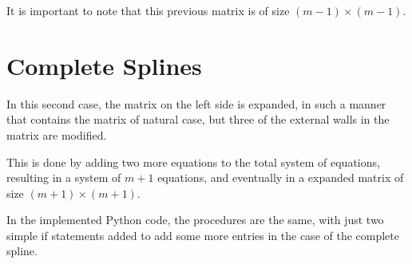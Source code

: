 \documentclass[paper=a4, fontsize=11pt]{scrartcl} %
\numberwithin{equation}{section} %
\numberwithin{figure}{section} %
\numberwithin{table}{section} %
\begin{document}
It is important to note that this previous matrix is of size $(m-1)\times(m-1)$.

\section{Complete Splines}

\begin{comment}
Restrictions: $\sigma_{0} = f(x_{0})$ and $\sigma_{m} = f(x_{m})$, which leads to the matrix formulation:

\begin{equation}
\begin{bmatrix}
4 & 1 &  &  &  &  \\
1 & 4 & 1 &  &  &  \\
 &  & ... &  &  &  \\
 &  &  & 1 & 4 & 1 \\
 &  &  &  & 1 & 4 \end{bmatrix}
\left[ \begin{array}{c} \sigma_1 \\ \sigma_2 \\ ... \\ \sigma_{m-2} \\ \sigma_{m-1} \end{array} \right]
=\frac{6}{h^{2}}
\left[ \begin{array}{c} y_{2}-2y_{1}+y_{0}-{\color{red} \sigma_{0}\frac{h^{2}}{6} } \\ y_{3}-2y_{2}+y_{1} \\ ... \\ y_{m-1}-2y_{m-2}+y_{m-3} \\ y_{m}-2y_{m-1}+y_{m-2}-{\color{red} \sigma_{m-1}\frac{h^{2}}{6} } \end{array} \right]
\end{equation}
\end{comment}


In this second case, the matrix on the left side is expanded, in such a manner that contains the matrix of natural case, but three of the external walls in the matrix are modified.

This is done by adding two more equations to the total system of equations, resulting in a system of $m+1$ equations, and eventually in a expanded matrix of size $(m+1)\times (m+1)$.

In the implemented Python code, the procedures are the same, with just two simple if statements added to add some more entries in the case of the complete spline.
\end{document}
